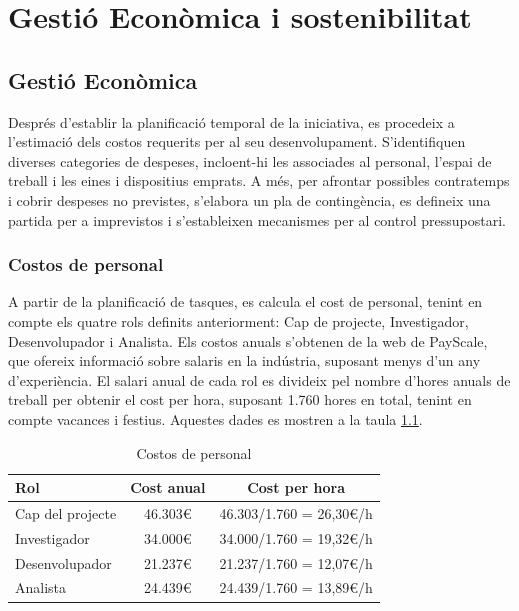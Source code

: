 \documentclass[a4paper,12pt]{report}
\begin{document}
\chapter{Gestió Econòmica i sostenibilitat}

\section{Gestió Econòmica}

Després d'establir la planificació temporal de la iniciativa, es procedeix a l'estimació dels costos requerits per al seu desenvolupament. S'identifiquen diverses categories de despeses, incloent-hi les associades al personal, l'espai de treball i les eines i dispositius emprats. A més, per afrontar possibles contratemps i cobrir despeses no previstes, s'elabora un pla de contingència, es defineix una partida per a imprevistos i s'estableixen mecanismes per al control pressupostari.

\subsection{Costos de personal}

A partir de la planificació de tasques, es calcula el cost de personal, tenint en compte els quatre rols definits anteriorment: Cap de projecte, Investigador, Desenvolupador i Analista.
Els costos anuals s'obtenen de la web de PayScale, que ofereix informació sobre salaris en la indústria, suposant menys d'un any d'experiència. El salari anual de cada rol es divideix pel nombre d'hores anuals de treball per obtenir el cost per hora, suposant 1.760 hores en total, tenint en compte vacances i festius.
Aquestes dades es mostren a la taula \ref{tab:costos_personal}.

\begin{table}[H]
    \centering
    \begin{tabular}{|l|c|c|}
    \hline
    \textbf{Rol}     & \textbf{Cost anual} & \textbf{Cost per hora}  \\ \hline
    Cap del projecte & 46.303€\cite{ProjectManager}             & 46.303/1.760 = 26,30€/h \\ \hline
    Investigador     & 34.000€\cite{Research}             & 34.000/1.760 = 19,32€/h \\ \hline
    Desenvolupador   & 21.237€\cite{SoftwareDeveloper}             & 21.237/1.760 = 12,07€/h \\ \hline
    Analista         & 24.439€\cite{DataAnalyst}             & 24.439/1.760 = 13,89€/h \\ \hline
    \end{tabular}
    \caption{Costos de personal}
    \label{tab:costos_personal}
\end{table}
\end{document}
